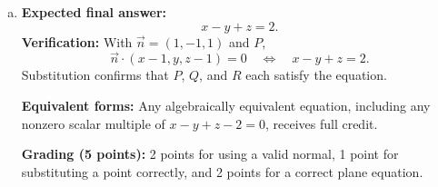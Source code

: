 \documentclass[12pt]{exam}
\begin{document}
\begin{enumerate}
\begin{enumerate}[(a)]
  \textbf{Grading (5 points):} 2 points for the two edge vectors and 3 points
  for the correct cross product.

  \item \textbf{Expected final answer:}
  \[
    x-y+z=2.
  \]
  \textbf{Verification:} With $\vec{n}=(1,-1,1)$ and $P$,
  \[
    \vec{n}\cdot(x-1,y,z-1)=0
    \quad\Longleftrightarrow\quad x-y+z=2.
  \]
  Substitution confirms that $P$, $Q$, and $R$ each satisfy the equation.

  \textbf{Equivalent forms:} Any algebraically equivalent equation, including
  any nonzero scalar multiple of $x-y+z-2=0$, receives full credit.

  \textbf{Grading (5 points):} 2 points for using a valid normal, 1 point
  for substituting a point correctly, and 2 points for a correct plane
  equation.
\end{enumerate}

\end{enumerate}
\end{document}
